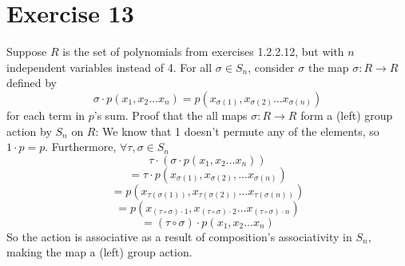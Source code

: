 \documentclass{article}
\begin{document}
    \section*{Exercise 13}
    Suppose $R$ is the set of polynomials from exercises 1.2.2.12,
    but with $n$ independent variables instead of 4.
    For all $\sigma \in S_n$,
    consider $\sigma$ the map $\sigma: R \to R$ defined by \\
    \[\sigma \cdot p(x_1, x_2 \dots x_n)
    = p(x_{\sigma(1)}, x_{\sigma(2)} \dots x_{\sigma(n)})\]
    for each term in $p$'s sum.
    Proof that the all maps $\sigma: R \to R$
    form a (left) group action by $S_n$ on $R$:
    We know that 1 doesn't permute any of the elements,
    so $1 \cdot p = p$.
    Furthermore, $\forall \tau, \sigma \in S_n$
    \[\tau \cdot (\sigma \cdot p(x_1, x_2 \dots x_n)) \]
    \[ = \tau \cdot p(x_{\sigma(1)}, x_{\sigma(2)}, \dots x_{\sigma(n)}) \]
    \[= p(x_{\tau(\sigma(1))}, x_{\tau(\sigma(2))}
    \dots x_{\tau(\sigma(n))}) \]
    \[ = p(x_{(\tau \circ \sigma) \cdot 1},
    x_{(\tau \circ \sigma) \cdot 2}
    \dots x_{(\tau \circ \sigma) \cdot n}) \]
    \[= (\tau \circ \sigma) \cdot p(x_1, x_2 \dots x_n) \]
    So the action is associative as a result of composition's
    associativity in $S_n$,
    making the map a (left) group action.
\end{document}
